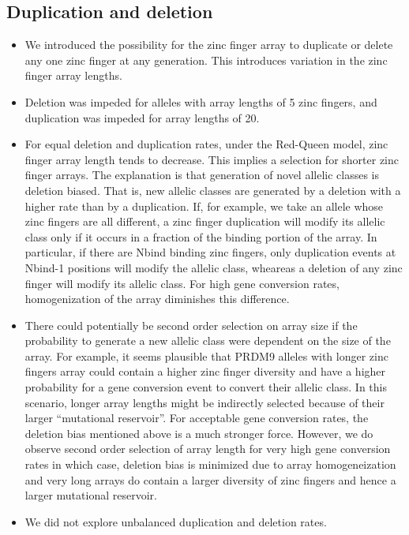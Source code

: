 \documentclass[a4paper,10pt]{article}
\begin{document}
\subsection{Duplication and deletion}

\begin{itemize}
\item We introduced the possibility for the zinc finger array to duplicate or delete any one zinc finger at any generation. This introduces variation in the zinc finger array lengths. 
\item Deletion was impeded for alleles with array lengths of 5 zinc fingers, and duplication was impeded for array lengths of 20. 
\item For equal deletion and duplication rates, under the Red-Queen model, zinc finger array length tends to decrease. This implies a selection for shorter zinc finger arrays. The explanation is that generation of novel allelic classes is deletion biased. That is, new allelic classes are generated by a deletion with a higher rate than by a duplication. If, for example, we take an allele whose zinc fingers are all different, a zinc finger duplication will modify its allelic class only if it occurs in a fraction of the binding portion of the array. In particular, if there are Nbind binding zinc fingers, only duplication events at Nbind-1 positions will modify the allelic class, wheareas a deletion of any zinc finger will modify its allelic class. For high gene conversion rates, homogenization of the array diminishes this difference.
\item There could potentially be second order selection on array size if the probability to generate a new allelic class were dependent on the size of the array. For example, it seems plausible that PRDM9 alleles with longer zinc fingers array could contain a higher zinc finger diversity and have a higher probability for a gene conversion event to convert their allelic class. In this scenario, longer array lengths might be indirectly selected because of their larger ``mutational reservoir''. For acceptable gene conversion rates, the deletion bias mentioned above is a much stronger force. However, we do observe second order selection of array length for very high gene conversion rates in which case, deletion bias is minimized due to array homogeneization and very long arrays do contain a larger diversity of zinc fingers and hence a larger mutational reservoir.
\item We did not explore unbalanced duplication and deletion rates. 
\end{itemize}
\end{document}
